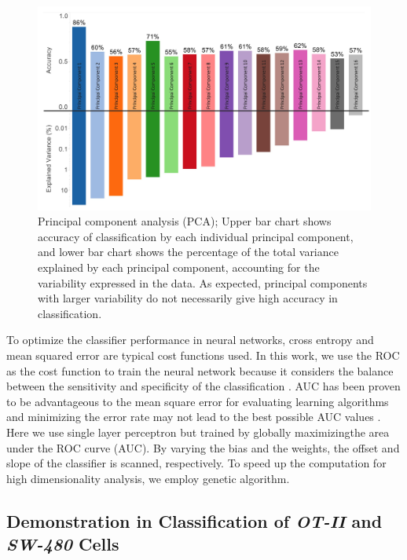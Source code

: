 \documentclass[aps,pra,reprint,superscriptaddress]{revtex4-1}
\begin{document}
\begin{figure}
\includegraphics[scale=0.18]{FigurePCA.jpg}
\caption{\label{fig:PCA} Principal component analysis (PCA); Upper bar chart shows accuracy of classification by each individual principal component, and lower bar chart shows the percentage of the total variance explained by each principal component, accounting for the variability expressed in the data. As expected, principal components with larger variability do not necessarily give high accuracy in classification.}
\end{figure}

To optimize the classifier performance in neural networks, cross entropy and mean squared error are typical cost functions used. In this work, we use the ROC as the cost function to train the neural network because it considers the balance between the sensitivity and specificity of the classification \cite{hanley1982meaning}. AUC has been proven to be advantageous to the mean square error for evaluating learning algorithms \cite{verrelst1998use} and minimizing the error rate may not lead to the best possible AUC values \cite{cortes2004auc,huang2005using}. Here we use single layer perceptron but trained by globally maximizingthe area under the ROC curve (AUC). By varying the bias and the weights, the offset and slope of the classifier is scanned, respectively. To speed up the computation for high dimensionality analysis, we employ genetic algorithm. 

\subsection{Demonstration in Classification of \textit{OT-II} and \textit{SW-480} Cells}
\end{document}
